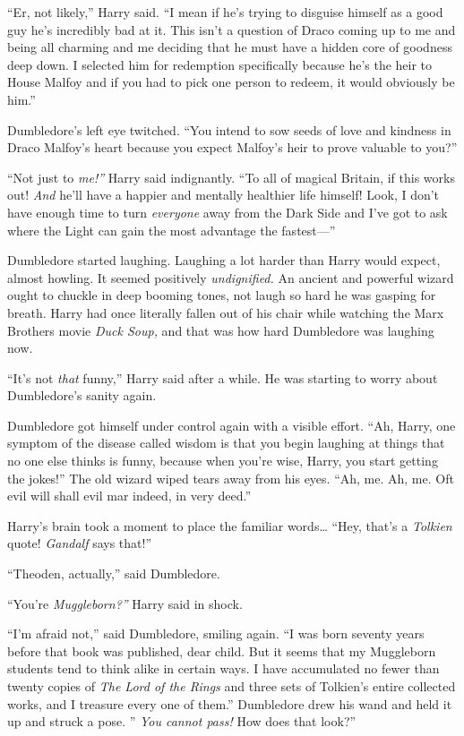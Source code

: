``Er, not likely,'' Harry said. ``I mean if he's trying to disguise
himself as a good guy he's incredibly bad at it. This isn't a question
of Draco coming up to me and being all charming and me deciding that he
must have a hidden core of goodness deep down. I selected him for
redemption specifically because he's the heir to House Malfoy and if you
had to pick one person to redeem, it would obviously be him.''

Dumbledore's left eye twitched. ``You intend to sow seeds of love and
kindness in Draco Malfoy's heart because you expect Malfoy's heir to
prove valuable to you?''

``Not just to \emph{me!''} Harry said indignantly. ``To all of magical
Britain, if this works out! \emph{And} he'll have a happier and mentally
healthier life himself! Look, I don't have enough time to turn
\emph{everyone} away from the Dark Side and I've got to ask where the
Light can gain the most advantage the fastest---''

Dumbledore started laughing. Laughing a lot harder than Harry would
expect, almost howling. It seemed positively \emph{undignified.} An
ancient and powerful wizard ought to chuckle in deep booming tones, not
laugh so hard he was gasping for breath. Harry had once literally fallen
out of his chair while watching the Marx Brothers movie \emph{Duck
Soup,} and that was how hard Dumbledore was laughing now.

``It's not \emph{that} funny,'' Harry said after a while. He was
starting to worry about Dumbledore's sanity again.

Dumbledore got himself under control again with a visible effort. ``Ah,
Harry, one symptom of the disease called wisdom is that you begin
laughing at things that no one else thinks is funny, because when you're
wise, Harry, you start getting the jokes!'' The old wizard wiped tears
away from his eyes. ``Ah, me. Ah, me. Oft evil will shall evil mar
indeed, in very deed.''

Harry's brain took a moment to place the familiar words\ldots{} ``Hey,
that's a \emph{Tolkien} quote! \emph{Gandalf} says that!''

``Theoden, actually,'' said Dumbledore.

``You're \emph{Muggleborn?''} Harry said in shock.

``I'm afraid not,'' said Dumbledore, smiling again. ``I was born seventy
years before that book was published, dear child. But it seems that my
Muggleborn students tend to think alike in certain ways. I have
accumulated no fewer than twenty copies of \emph{The Lord of the Rings}
and three sets of Tolkien's entire collected works, and I treasure every
one of them.'' Dumbledore drew his wand and held it up and struck a
pose. '' \emph{You cannot pass!} How does that look?''

